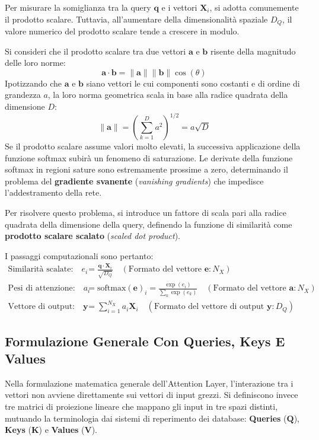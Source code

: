 ﻿\documentclass[11pt, a4paper]{article}
\begin{document}
Per misurare la somiglianza tra la query $\bm{q}$ e i vettori $\bm{X}_i$, si adotta comunemente il prodotto scalare. Tuttavia, all'aumentare della dimensionalità spaziale $D_Q$, il valore numerico del prodotto scalare tende a crescere in modulo.

Si consideri che il prodotto scalare tra due vettori $\bm{a}$ e $\bm{b}$ risente della magnitudo delle loro norme:
\[ \bm{a} \cdot \bm{b} = \|\bm{a}\| \|\bm{b}\| \cos(\theta) \]
Ipotizzando che $\bm{a}$ e $\bm{b}$ siano vettori le cui componenti sono costanti e di ordine di grandezza $a$, la loro norma geometrica scala in base alla radice quadrata della dimensione $D$:
\[ \|\bm{a}\| = \left( \sum_{k=1}^{D} a^2 \right)^{1/2} = a\sqrt{D} \]
Se il prodotto scalare assume valori molto elevati, la successiva applicazione della funzione softmax subirà un fenomeno di saturazione. Le derivate della funzione softmax in regioni sature sono estremamente prossime a zero, determinando il problema del \textbf{gradiente svanente} (\emph{vanishing gradients}) che impedisce l'addestramento della rete.

Per risolvere questo problema, si introduce un fattore di scala pari alla radice quadrata della dimensione della query, definendo la funzione di similarità come \textbf{prodotto scalare scalato} (\emph{scaled dot product}).

I passaggi computazionali sono pertanto:
\begin{align*}
\text{Similarità scalate:} \quad e_i &= \frac{\bm{q} \cdot \bm{X}_i}{\sqrt{D_Q}} \quad (\text{Formato del vettore } \bm{e}: N_X) \\
\text{Pesi di attenzione:} \quad a_i &= \text{softmax}(\bm{e})_i = \frac{\exp(e_i)}{\sum_k \exp(e_k)} \quad (\text{Formato del vettore } \bm{a}: N_X) \\
\text{Vettore di output:} \quad \bm{y} &= \sum_{i=1}^{N_X} a_i \bm{X}_i \quad (\text{Formato del vettore di output } \bm{y}: D_Q)
\end{align*}

\subsection{Formulazione Generale Con Queries, Keys E Values}

Nella formulazione matematica generale dell'Attention Layer, l'interazione tra i vettori non avviene direttamente sui vettori di input grezzi. Si definiscono invece tre matrici di proiezione lineare che mappano gli input in tre spazi distinti, mutuando la terminologia dai sistemi di reperimento dei database: \textbf{Queries} ($\bm{Q}$), \textbf{Keys} ($\bm{K}$) e \textbf{Values} ($\bm{V}$).
\end{document}
